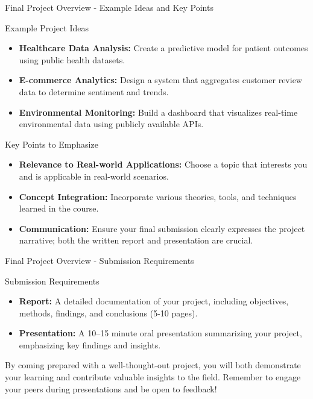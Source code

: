 \documentclass[aspectratio=169]{beamer}
\begin{document}
\begin{frame}[fragile]{Final Project Overview - Example Ideas and Key Points}
    \begin{block}{Example Project Ideas}
        \begin{itemize}
            \item \textbf{Healthcare Data Analysis:} Create a predictive model for patient outcomes using public health datasets.
            \item \textbf{E-commerce Analytics:} Design a system that aggregates customer review data to determine sentiment and trends.
            \item \textbf{Environmental Monitoring:} Build a dashboard that visualizes real-time environmental data using publicly available APIs.
        \end{itemize}
    \end{block}

    \begin{block}{Key Points to Emphasize}
        \begin{itemize}
            \item \textbf{Relevance to Real-world Applications:} Choose a topic that interests you and is applicable in real-world scenarios.
            \item \textbf{Concept Integration:} Incorporate various theories, tools, and techniques learned in the course.
            \item \textbf{Communication:} Ensure your final submission clearly expresses the project narrative; both the written report and presentation are crucial.
        \end{itemize}
    \end{block}
\end{frame}

\begin{frame}[fragile]{Final Project Overview - Submission Requirements}
    \begin{block}{Submission Requirements}
        \begin{itemize}
            \item \textbf{Report:} A detailed documentation of your project, including objectives, methods, findings, and conclusions (5-10 pages).
            \item \textbf{Presentation:} A 10–15 minute oral presentation summarizing your project, emphasizing key findings and insights.
        \end{itemize}
    \end{block}
    By coming prepared with a well-thought-out project, you will both demonstrate your learning and contribute valuable insights to the field. Remember to engage your peers during presentations and be open to feedback!
\end{frame}
\end{document}
